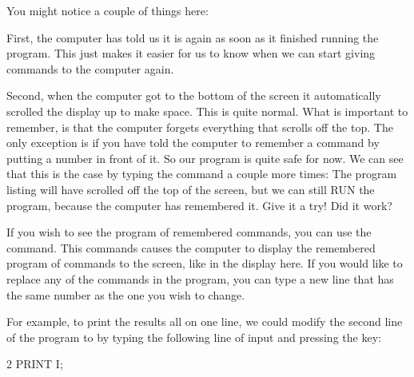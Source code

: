   You might notice a couple of things here:

  First, the computer has told us it is  again
  as soon as it finished running the program. This just makes it easier for us to know when we
  can start giving commands to the computer again.

  Second, when the computer got to the bottom of the screen
  it automatically scrolled the display up to make space.  This is quite normal.  What is important
  to remember, is that the computer forgets everything that scrolls off the top.  The only exception
  is if you have told the computer to remember a command by putting a number in front of it.  So
  our program is quite safe for now. We can see that this is the case by typing the  command a
  couple more times: The program listing will have scrolled off the top of the screen, but we can
  still RUN the program, because the computer has remembered it.  Give it a try!
  Did it work?

\needspace{4cm} %
  If you wish to see the program of remembered commands, you can use the 
  command.  This commands causes the computer to display the remembered program of commands to the screen, like in the display here.
  If you would like to replace any of the commands in the program, you can type a new line that has the same number as the one you
  wish to change.


\needspace{4cm} %
  For example, to print the results all on one line, we could modify the second line of the program to  by
  typing the following line of input and pressing the  key:



\begin{screenoutput}
2 PRINT I;
\end{screenoutput}


\needspace{4cm} %

